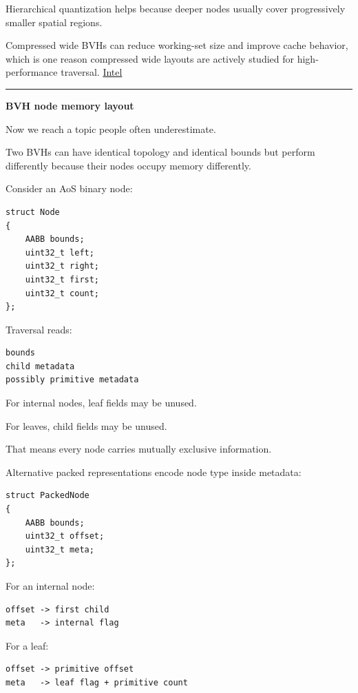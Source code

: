 Hierarchical quantization helps because deeper nodes usually cover progressively smaller spatial regions.

Compressed wide BVHs can reduce working-set size and improve cache behavior, which is one reason compressed wide layouts are actively studied for high-performance traversal. \href{https://www.intel.com/content/dam/develop/external/us/en/documents/wide-bvh-traversal-with-a-short-stack-837099.pdf?utm_source=chatgpt.com}{Intel}

\begin{center}\rule{0.5\linewidth}{0.5pt}\end{center}

\textbf{BVH node memory layout}

Now we reach a topic people often underestimate.

Two BVHs can have identical topology and identical bounds but perform differently because their nodes occupy memory differently.

Consider an AoS binary node:

\begin{verbatim}
struct Node
{
    AABB bounds;
    uint32_t left;
    uint32_t right;
    uint32_t first;
    uint32_t count;
};
\end{verbatim}

Traversal reads:

\begin{verbatim}
bounds
child metadata
possibly primitive metadata
\end{verbatim}

For internal nodes, leaf fields may be unused.

For leaves, child fields may be unused.

That means every node carries mutually exclusive information.

Alternative packed representations encode node type inside metadata:

\begin{verbatim}
struct PackedNode
{
    AABB bounds;
    uint32_t offset;
    uint32_t meta;
};
\end{verbatim}

For an internal node:

\begin{verbatim}
offset -> first child
meta   -> internal flag
\end{verbatim}

For a leaf:

\begin{verbatim}
offset -> primitive offset
meta   -> leaf flag + primitive count
\end{verbatim}

